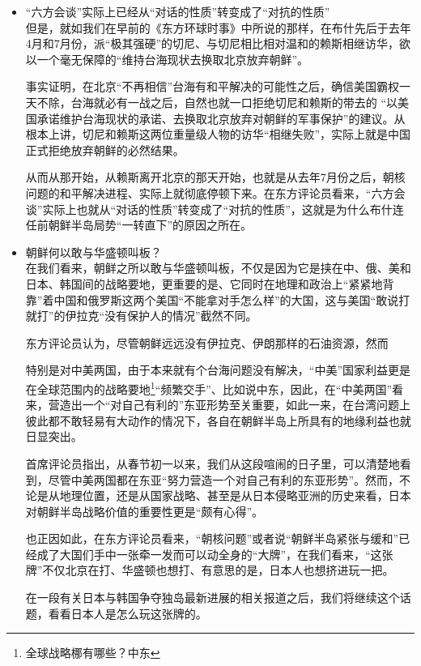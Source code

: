 \documentclass[a4paper,11pt]{article}
\begin{document}
\begin{itemize}
\begin{itemize}
 


\item “六方会谈”实际上已经从“对话的性质”转变成了“对抗的性质”\\
\label{sec-1_1_2}%
但是，就如我们在早前的《东方环球时事》中所说的那样，在布什先后于去年4月和7月份，派“极其强硬”的切尼、与切尼相比相对温和的赖斯相继访华，欲以一个毫无保障的“维持台海现状去换取北京放弃朝鲜”。

    事实证明，在北京“不再相信”台海有和平解决的可能性之后，确信美国霸权一天不除，台海就必有一战之后，自然也就一口拒绝切尼和赖斯的带去的 “以美国承诺维护台海现状的承诺、去换取北京放弃对朝鲜的军事保护”的建议。从根本上讲，切尼和赖斯这两位重量级人物的访华“相继失败”，实际上就是中国正式拒绝放弃朝鲜的必然结果。

    从而从那开始，从赖斯离开北京的那天开始，也就是从去年7月份之后，朝核问题的和平解决进程、实际上就彻底停顿下来。在东方评论员看来，“六方会谈”实际上也就从“对话的性质”转变成了“对抗的性质”，这就是为什么布什连任前朝鲜半岛局势“一转直下”的原因之所在。


\item 朝鲜何以敢与华盛顿叫板？\\
\label{sec-1_1_3}%
在我们看来，朝鲜之所以敢与华盛顿叫板，不仅是因为它是挟在中、俄、美和日本、韩国间的战略要地，更重要的是、它同时在地理和政治上“紧紧地背靠”着中国和俄罗斯这两个美国“不能拿对手怎么样”的大国，这与美国“敢说打就打”的伊拉克“没有保护人的情况”截然不同。

    东方评论员认为，尽管朝鲜远远没有伊拉克、伊朗那样的石油资源，然而

    特别是对中美两国，由于本来就有个台海问题没有解决，“中美”国家利益更是在全球范围内的战略要地\footnote{全球战略梛有哪些？中东 }“频繁交手”、比如说中东，因此，在“中美两国”看来，营造出一个“对自己有利的”东亚形势至关重要，如此一来，在台湾问题上彼此都不敢轻易有大动作的情况下，各自在朝鲜半岛上所具有的地缘利益也就日显突出。

    首席评论员指出，从春节初一以来，我们从这段喧闹的日子里，可以清楚地看到，尽管中美两国都在东亚“努力营造一个对自己有利的东亚形势”。然而，不论是从地理位置，还是从国家战略、甚至是从日本侵略亚洲的历史来看，日本对朝鲜半岛战略价值的重要性更是“颇有心得”。

    也正因如此，在东方评论员看来，“朝核问题”或者说“朝鲜半岛紧张与缓和”已经成了大国们手中一张牵一发而可以动全身的“大牌”，在我们看来，“这张牌”不仅北京在打、华盛顿也想打、有意思的是，日本人也想挤进玩一把。

    在一段有关日本与韩国争夺独岛最新进展的相关报道之后，我们将继续这个话题，看看日本人是怎么玩这张牌的。



\end{itemize}
\end{itemize}
\end{document}

